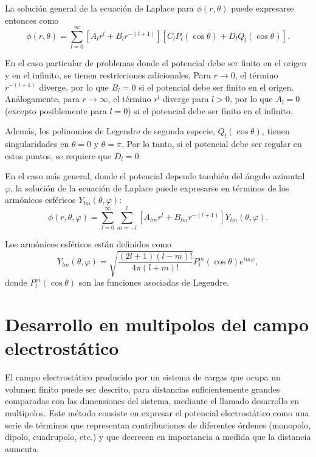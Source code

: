 \documentclass[12pt,a4paper]{book}
\begin{document}
La solución general de la ecuación de Laplace para $\phi(r, \theta)$ puede expresarse entonces como
\begin{equation}
\phi(r, \theta) = \sum_{l=0}^{\infty}\left[A_l r^l + B_l r^{-(l+1)}\right]\left[C_l P_l(\cos\theta) + D_l Q_l(\cos\theta)\right].
\end{equation}

En el caso particular de problemas donde el potencial debe ser finito en el origen y en el infinito, se tienen restricciones adicionales. Para $r \to 0$, el término $r^{-(l+1)}$ diverge, por lo que $B_l = 0$ si el potencial debe ser finito en el origen. Análogamente, para $r \to \infty$, el término $r^l$ diverge para $l > 0$, por lo que $A_l = 0$ (excepto posiblemente para $l = 0$) si el potencial debe ser finito en el infinito.

Además, los polinomios de Legendre de segunda especie, $Q_l(\cos\theta)$, tienen singularidades en $\theta = 0$ y $\theta = \pi$. Por lo tanto, si el potencial debe ser regular en estos puntos, se requiere que $D_l = 0$.

En el caso más general, donde el potencial depende también del ángulo azimutal $\varphi$, la solución de la ecuación de Laplace puede expresarse en términos de los armónicos esféricos $Y_{lm}(\theta, \varphi)$:
\begin{equation}
\phi(r, \theta, \varphi) = \sum_{l=0}^{\infty}\sum_{m=-l}^{l}\left[A_{lm}r^l + B_{lm}r^{-(l+1)}\right]Y_{lm}(\theta, \varphi).
\end{equation}

Los armónicos esféricos están definidos como
\begin{equation}
Y_{lm}(\theta, \varphi) = \sqrt{\frac{(2l+1)(l-m)!}{4\pi(l+m)!}}P_l^m(\cos\theta)e^{im\varphi},
\end{equation}
donde $P_l^m(\cos\theta)$ son las funciones asociadas de Legendre.

\section{Desarrollo en multipolos del campo electrostático}

El campo electrostático producido por un sistema de cargas que ocupa un volumen finito puede ser descrito, para distancias suficientemente grandes comparadas con las dimensiones del sistema, mediante el llamado desarrollo en multipolos. Este método consiste en expresar el potencial electrostático como una serie de términos que representan contribuciones de diferentes órdenes (monopolo, dipolo, cuadrupolo, etc.) y que decrecen en importancia a medida que la distancia aumenta.
\end{document}
